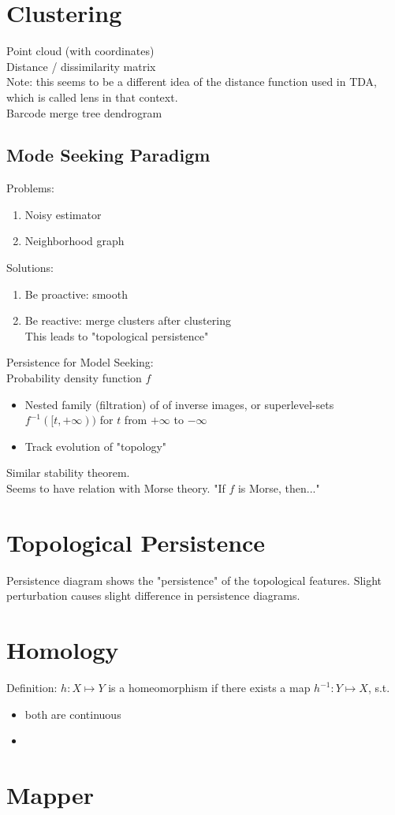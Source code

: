 \documentclass[10pt,a4paper]{report}
\begin{document}
\section{Clustering}
Point cloud (with coordinates)\\

Distance / dissimilarity matrix\\

Note: this seems to be a different idea of the distance function used in TDA, which is called lens in that context.\\

Barcode \textrightarrow merge tree \textrightarrow dendrogram

\subsection{Mode Seeking Paradigm}
Problems:
\begin{enumerate}
	\item Noisy estimator
	\item Neighborhood graph
\end{enumerate}
Solutions:
\begin{enumerate}
	\item Be proactive: smooth
	\item Be reactive: merge clusters after clustering\\
		  This leads to "topological persistence"
\end{enumerate}

Persistence for Model Seeking:\\
Probability density function $f$\\
\begin{itemize}
	\item Nested family (filtration) of of inverse images, or superlevel-sets $f^{-1}([t,+\infty))$ for 			  $t$ from $+\infty$ to $-\infty$
	\item Track evolution of "topology"
\end{itemize}
Similar stability theorem.\\
Seems to have relation with Morse theory. "If $f$ is Morse, then..."\\

\section{Topological Persistence}
Persistence diagram shows the "persistence" of the topological features.
Slight perturbation causes slight difference in persistence diagrams.

\section{Homology}
Definition: $h:X\mapsto Y$ is a homeomorphism if there exists a map $h^{-1}:Y\mapsto X$, s.t.
\begin{itemize}
	\item both are continuous
	\item
\end{itemize}


\section{Mapper}
\end{document}
